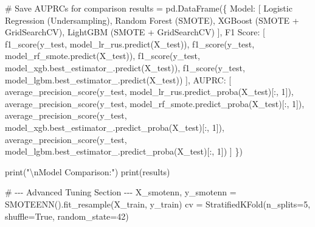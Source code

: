 \documentclass[
  letterpaper,
  DIV=11,
  numbers=noendperiod]{scrartcl}
\newenvironment{Shaded}{\begin{snugshade}}{\end{snugshade}}
\newcommand{\BuiltInTok}[1]{\textcolor[rgb]{0.00,0.23,0.31}{#1}}
\newcommand{\CharTok}[1]{\textcolor[rgb]{0.13,0.47,0.30}{#1}}
\newcommand{\CommentTok}[1]{\textcolor[rgb]{0.37,0.37,0.37}{#1}}
\newcommand{\DecValTok}[1]{\textcolor[rgb]{0.68,0.00,0.00}{#1}}
\newcommand{\NormalTok}[1]{\textcolor[rgb]{0.00,0.23,0.31}{#1}}
\newcommand{\OperatorTok}[1]{\textcolor[rgb]{0.37,0.37,0.37}{#1}}
\newcommand{\StringTok}[1]{\textcolor[rgb]{0.13,0.47,0.30}{#1}}
\newcommand{\VariableTok}[1]{\textcolor[rgb]{0.07,0.07,0.07}{#1}}
\begin{document}
\begin{Shaded}
\begin{Highlighting}[]
    \CommentTok{\# Save AUPRCs for comparison}
\NormalTok{    results }\OperatorTok{=}\NormalTok{ pd.DataFrame(\{}
        \StringTok{\textquotesingle{}Model\textquotesingle{}}\NormalTok{: [}
            \StringTok{\textquotesingle{}Logistic Regression (Undersampling)\textquotesingle{}}\NormalTok{, }
            \StringTok{\textquotesingle{}Random Forest (SMOTE)\textquotesingle{}}\NormalTok{, }
            \StringTok{\textquotesingle{}XGBoost (SMOTE + GridSearchCV)\textquotesingle{}}\NormalTok{, }
            \StringTok{\textquotesingle{}LightGBM (SMOTE + GridSearchCV)\textquotesingle{}}
\NormalTok{        ],}
        \StringTok{\textquotesingle{}F1 Score\textquotesingle{}}\NormalTok{: [}
\NormalTok{            f1\_score(y\_test, model\_lr\_rus.predict(X\_test)),}
\NormalTok{            f1\_score(y\_test, model\_rf\_smote.predict(X\_test)),}
\NormalTok{            f1\_score(y\_test, model\_xgb.best\_estimator\_.predict(X\_test)),}
\NormalTok{            f1\_score(y\_test, model\_lgbm.best\_estimator\_.predict(X\_test))}
\NormalTok{        ],}
        \StringTok{\textquotesingle{}AUPRC\textquotesingle{}}\NormalTok{: [}
\NormalTok{            average\_precision\_score(y\_test, model\_lr\_rus.predict\_proba(X\_test)[:, }\DecValTok{1}\NormalTok{]),}
\NormalTok{            average\_precision\_score(y\_test, model\_rf\_smote.predict\_proba(X\_test)[:, }\DecValTok{1}\NormalTok{]),}
\NormalTok{            average\_precision\_score(y\_test, model\_xgb.best\_estimator\_.predict\_proba(X\_test)[:, }\DecValTok{1}\NormalTok{]),}
\NormalTok{            average\_precision\_score(y\_test, model\_lgbm.best\_estimator\_.predict\_proba(X\_test)[:, }\DecValTok{1}\NormalTok{])}
\NormalTok{        ]}
\NormalTok{    \})}

    \BuiltInTok{print}\NormalTok{(}\StringTok{"}\CharTok{\textbackslash{}n}\StringTok{Model Comparison:"}\NormalTok{)}
    \BuiltInTok{print}\NormalTok{(results)}

    \CommentTok{\# {-}{-}{-} Advanced Tuning Section {-}{-}{-}}
\NormalTok{    X\_smotenn, y\_smotenn }\OperatorTok{=}\NormalTok{ SMOTEENN().fit\_resample(X\_train, y\_train)}
\NormalTok{    cv }\OperatorTok{=}\NormalTok{ StratifiedKFold(n\_splits}\OperatorTok{=}\DecValTok{5}\NormalTok{, shuffle}\OperatorTok{=}\VariableTok{True}\NormalTok{, random\_state}\OperatorTok{=}\DecValTok{42}\NormalTok{)}


\end{Highlighting}
\end{Shaded}
\end{document}
